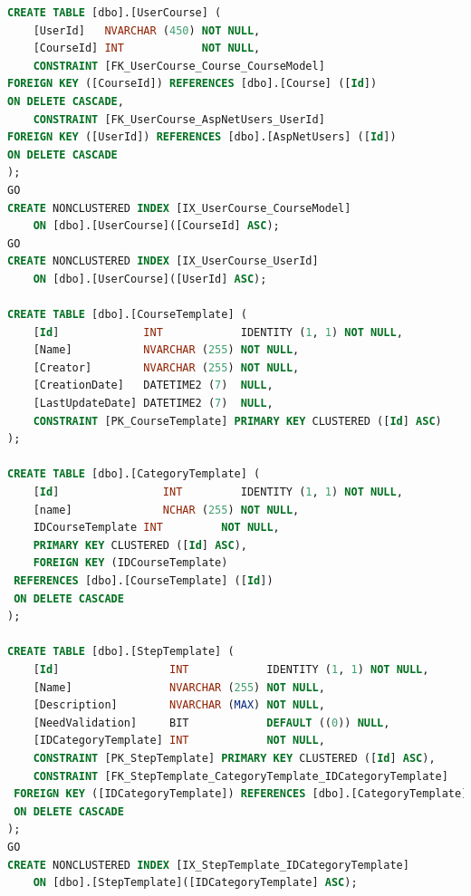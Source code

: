 \begin{lstlisting}[language=SQL, caption=traduzione della progettazione del database nel linguaggio SQL]
CREATE TABLE [dbo].[UserCourse] ( 
	[UserId]   NVARCHAR (450) NOT NULL, 
	[CourseId] INT            NOT NULL, 
	CONSTRAINT [FK_UserCourse_Course_CourseModel]  
FOREIGN KEY ([CourseId]) REFERENCES [dbo].[Course] ([Id]) 
ON DELETE CASCADE, 
	CONSTRAINT [FK_UserCourse_AspNetUsers_UserId]  
FOREIGN KEY ([UserId]) REFERENCES [dbo].[AspNetUsers] ([Id]) 
ON DELETE CASCADE 
); 
GO 
CREATE NONCLUSTERED INDEX [IX_UserCourse_CourseModel] 
    ON [dbo].[UserCourse]([CourseId] ASC); 
GO 
CREATE NONCLUSTERED INDEX [IX_UserCourse_UserId] 
    ON [dbo].[UserCourse]([UserId] ASC); 
 
CREATE TABLE [dbo].[CourseTemplate] ( 
    [Id]             INT            IDENTITY (1, 1) NOT NULL, 
    [Name]           NVARCHAR (255) NOT NULL, 
    [Creator]        NVARCHAR (255) NOT NULL, 
    [CreationDate]   DATETIME2 (7)  NULL, 
    [LastUpdateDate] DATETIME2 (7)  NULL, 
    CONSTRAINT [PK_CourseTemplate] PRIMARY KEY CLUSTERED ([Id] ASC) 
); 
 
CREATE TABLE [dbo].[CategoryTemplate] ( 
    [Id]                INT         IDENTITY (1, 1) NOT NULL, 
    [name]              NCHAR (255) NOT NULL, 
    IDCourseTemplate INT         NOT NULL, 
    PRIMARY KEY CLUSTERED ([Id] ASC), 
    FOREIGN KEY (IDCourseTemplate)  
 REFERENCES [dbo].[CourseTemplate] ([Id]) 
 ON DELETE CASCADE 
); 
 
CREATE TABLE [dbo].[StepTemplate] ( 
    [Id]                 INT            IDENTITY (1, 1) NOT NULL, 
    [Name]               NVARCHAR (255) NOT NULL, 
    [Description]        NVARCHAR (MAX) NOT NULL, 
    [NeedValidation]     BIT            DEFAULT ((0)) NULL, 
    [IDCategoryTemplate] INT            NOT NULL, 
    CONSTRAINT [PK_StepTemplate] PRIMARY KEY CLUSTERED ([Id] ASC), 
    CONSTRAINT [FK_StepTemplate_CategoryTemplate_IDCategoryTemplate]  
 FOREIGN KEY ([IDCategoryTemplate]) REFERENCES [dbo].[CategoryTemplate] ([Id]) 
 ON DELETE CASCADE 
); 
GO 
CREATE NONCLUSTERED INDEX [IX_StepTemplate_IDCategoryTemplate] 
    ON [dbo].[StepTemplate]([IDCategoryTemplate] ASC);
\end{lstlisting}
%

